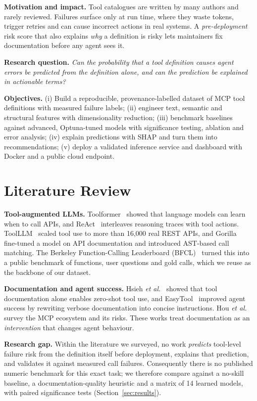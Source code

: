 \documentclass[conference]{IEEEtran}
\begin{document}
\textbf{Motivation and impact.} Tool catalogues are written by many authors and rarely reviewed. Failures surface only at run time, where they waste tokens, trigger retries and can cause incorrect actions in real systems. A \emph{pre-deployment} risk score that also explains \emph{why} a definition is risky lets maintainers fix documentation before any agent sees it.

\textbf{Research question.} \emph{Can the probability that a tool definition causes agent errors be predicted from the definition alone, and can the prediction be explained in actionable terms?}

\textbf{Objectives.} (i) Build a reproducible, provenance-labelled dataset of MCP tool definitions with measured failure labels; (ii) engineer text, semantic and structural features with dimensionality reduction; (iii) benchmark baselines against advanced, Optuna-tuned models with significance testing, ablation and error analysis; (iv) explain predictions with SHAP and turn them into recommendations; (v) deploy a validated inference service and dashboard with Docker and a public cloud endpoint.

\section{Literature Review}
\textbf{Tool-augmented LLMs.} Toolformer~\cite{toolformer} showed that language models can learn when to call APIs, and ReAct~\cite{react} interleaves reasoning traces with tool actions. ToolLLM~\cite{toolllm} scaled tool use to more than 16{,}000 real REST APIs, and Gorilla~\cite{gorilla} fine-tuned a model on API documentation and introduced AST-based call matching. The Berkeley Function-Calling Leaderboard (BFCL)~\cite{bfcl} turned this into a public benchmark of functions, user questions and gold calls, which we reuse as the backbone of our dataset.

\textbf{Documentation and agent success.} Hsieh \emph{et al.}~\cite{hsieh} showed that tool documentation alone enables zero-shot tool use, and EasyTool~\cite{easytool} improved agent success by rewriting verbose documentation into concise instructions. Hou \emph{et al.}~\cite{mcpsurvey} survey the MCP ecosystem and its risks. These works treat documentation as an \emph{intervention} that changes agent behaviour.

\textbf{Research gap.} Within the literature we surveyed, no work \emph{predicts} tool-level failure risk from the definition itself before deployment, explains that prediction, and validates it against measured call failures. Consequently there is no published numeric benchmark for this exact task; we therefore compare against a no-skill baseline, a documentation-quality heuristic and a matrix of 14 learned models, with paired significance tests (Section~\ref{sec:results}).
\end{document}
